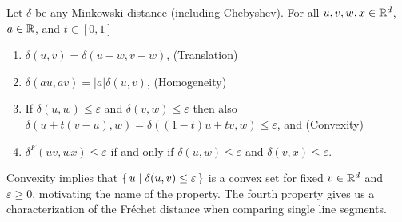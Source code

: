\begin{lemma}\label{lem:distance_properties}
	Let \(\delta\) be any Minkowski distance (including Chebyshev). For all \(u, v, w, x \in \mathbb{R}^d\), \(a \in \mathbb{R}\), and \(t \in [0, 1]\)
  \begin{enumerate}
		\item \(\delta(u, v) = \delta(u - w, v - w)\), \hfill (Translation)
		\item \(\delta(a u, a v) = |a| \delta(u, v)\), \hfill (Homogeneity)
		\item If \(\delta(u, w) \leq \varepsilon\) and \(\delta(v, w) \leq \varepsilon\) then also \(\delta(u + t(v-u), w) = \delta((1-t)u + tv, w) \leq \varepsilon\), and \hfill (Convexity)
		\item \(\delta^F(\overline{uv}, \overline{wx}) \leq \varepsilon\) if and only if \(\delta(u, w) \leq \varepsilon\) and \(\delta(v, x) \leq \varepsilon\).
	\end{enumerate}

\end{lemma}

Convexity implies that \(\set{u \mid \delta(u, v) \leq \varepsilon }\) is a convex set for fixed \(v \in \mathbb{R}^d\) and \(\varepsilon \geq 0\), motivating the name of the property. The fourth property gives us a characterization of the Fréchet distance when comparing single line segments. 

